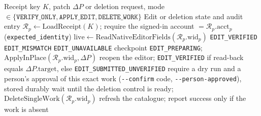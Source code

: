 \begin{algorithm}[htbp]
\caption{Identity-Bound In-Place Revision \& Consent-Bound Single-Work Deletion (\texttt{vpub edit} \& \texttt{vpub delete})}
\label{alg:editdelete}
\footnotesize
\begin{algorithmic}[1]
\Require Receipt key $K$, patch $\Delta P$ or deletion request, mode $\in \{\texttt{VERIFY\_ONLY}, \texttt{APPLY\_EDIT}, \texttt{DELETE\_WORK}\}$
\Ensure Edit or deletion state and audit entry
\State $\mathcal{R}_p \gets \text{LoadReceipt}(K)$; require the signed-in account $= \mathcal{R}_p.\text{acct}_p$ (\texttt{expected\_identity})
    \State $\text{live} \gets \text{ReadNativeEditorFields}(\mathcal{R}_p.\text{wid}_p)$ 
     \Return \texttt{EDIT\_VERIFIED}  \EndIf
     \Return \texttt{EDIT\_MISMATCH} \EndIf
     \Return \texttt{EDIT\_UNAVAILABLE}  \EndIf
    \State checkpoint \texttt{EDIT\_PREPARING}; $\text{ApplyInPlace}(\mathcal{R}_p.\text{wid}_p, \Delta P)$ 
    \State reopen the editor; \Return \texttt{EDIT\_VERIFIED} if read-back equals $\Delta P.\text{target}$, else \texttt{EDIT\_SUBMITTED\_UNVERIFIED}
    \State require a dry run and a person's approval of this exact work (\texttt{-{}-confirm} code, \texttt{-{}-person-approved}), stored durably
    \State wait until the deletion control is ready; $\text{DeleteSingleWork}(\mathcal{R}_p.\text{wid}_p)$
    \State refresh the catalogue; report success only if the work is absent
\EndIf
\end{algorithmic}
\end{algorithm}
